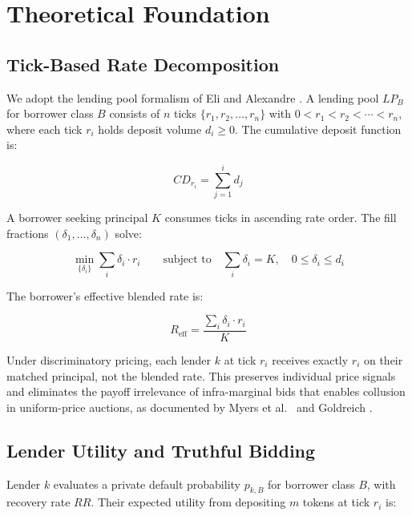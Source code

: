 \documentclass[a4paper,11pt]{article}
\begin{document}
\section{Theoretical Foundation}

\subsection{Tick-Based Rate Decomposition}

We adopt the lending pool formalism of Eli and Alexandre \cite{eli2025}.
A lending pool $LP_{B}$ for borrower class $B$ consists of $n$ ticks
$\{r_1, r_2, \ldots, r_n\}$ with $0 < r_1 < r_2 < \cdots < r_n$, where
each tick $r_i$ holds deposit volume $d_i \geq 0$. The cumulative deposit
function is:

\begin{equation}
    CD_{r_i} = \sum_{j=1}^{i} d_j
    \label{eq:cumdeposit}
\end{equation}

A borrower seeking principal $K$ consumes ticks in ascending rate order.
The fill fractions $(\delta_1, \ldots, \delta_n)$ solve:

\begin{equation}
    \min_{\{\delta_i\}} \sum_{i} \delta_i \cdot r_i
    \qquad \text{subject to} \quad
    \sum_{i} \delta_i = K, \quad 0 \leq \delta_i \leq d_i
    \label{eq:optim}
\end{equation}

The borrower's effective blended rate is:

\begin{equation}
    R_{\text{eff}} = \frac{\sum_{i} \delta_i \cdot r_i}{K}
    \label{eq:blended}
\end{equation}

Under discriminatory pricing, each lender $k$ at tick $r_i$ receives
exactly $r_i$ on their matched principal, not the blended rate. This
preserves individual price signals and eliminates the payoff irrelevance
of infra-marginal bids that enables collusion in uniform-price auctions,
as documented by Myers et al.\ \cite{myers2021} and Goldreich
\cite{goldreich2007}.

\subsection{Lender Utility and Truthful Bidding}

Lender $k$ evaluates a private default probability $p_{k,B}$ for borrower
class $B$, with recovery rate $RR$. Their expected utility from depositing
$m$ tokens at tick $r_i$ is:
\end{document}
